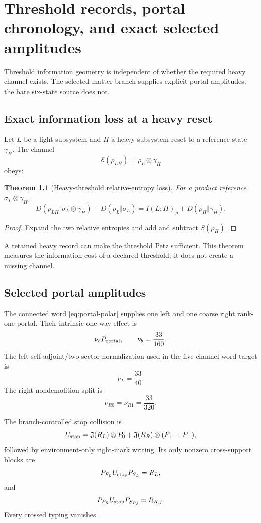 \documentclass[11pt,oneside,openany]{book}
\numberwithin{equation}{chapter}
\newtheorem{theorem}{Theorem}[chapter]
\theoremstyle{definition}
\theoremstyle{remark}
\begin{document}
\chapter{Threshold records, portal chronology, and exact selected amplitudes}
\label{ch:thresholds}

Threshold information geometry is independent of whether the required heavy
channel exists.  The selected matter branch supplies explicit portal
amplitudes; the bare six-state source does not.

\section{Exact information loss at a heavy reset}

Let \(L\) be a light subsystem and \(H\) a heavy subsystem reset to a reference
state \(\gamma_H\).  The channel
\[
 \mathcal E(\rho_{LH})=\rho_L\otimes\gamma_H
\]
obeys:

\begin{theorem}[Heavy-threshold relative-entropy loss]
\label{thm:threshold-loss}
For a product reference \(\sigma_L\otimes\gamma_H\),
\[
 \boxed{
 D(\rho_{LH}\Vert\sigma_L\otimes\gamma_H)
 -
 D(\rho_L\Vert\sigma_L)
 =
 I(L:H)_\rho
 +
 D(\rho_H\Vert\gamma_H).}
\]
\end{theorem}

\begin{proof}
Expand the two relative entropies and add and subtract \(S(\rho_H)\).
\end{proof}

A retained heavy record can make the threshold Petz sufficient.  This
theorem measures the information cost of a declared threshold; it does not
create a missing channel.

\section{Selected portal amplitudes}

The connected word \eqref{eq:portal-polar} supplies one left and one coarse
right rank-one portal.  Their intrinsic one-way effect is
\[
 \nu_bP_{\rm portal},
 \qquad
 \nu_b=\frac{33}{160}.
\]
The left self-adjoint/two-sector normalization used in the five-channel word
target is
\[
 \boxed{\nu_L=\frac{33}{40}.}
\]
The right nondemolition split is
\[
 \boxed{
 \nu_{R0}=\nu_{R1}=\frac{33}{320}.}
\]

The branch-controlled stop collision is
\[
 U_{\rm stop}
 =
 \mathfrak J(R_L)\otimes P_0
 +
 \mathfrak J(R_R)\otimes(P_++P_-),
\]
followed by environment-only right-mark writing.  Its only nonzero
cross-support blocks are
\[
 P_{F_L}U_{\rm stop}P_{S_L}=R_L,
\]
and
\[
 P_{F_R}U_{\rm stop}P_{S_{Rj}}=R_{R,j}.
\]
Every crossed typing vanishes.
\end{document}
